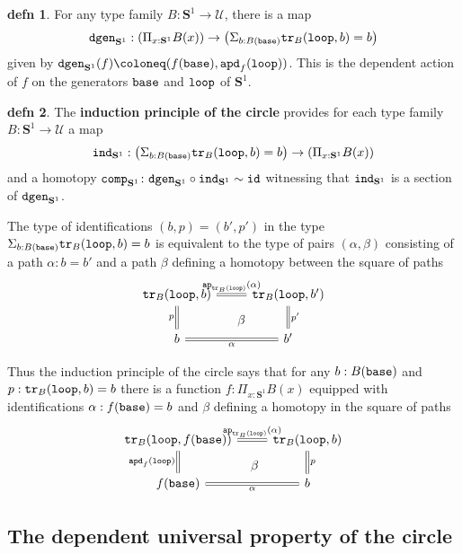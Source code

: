 \documentclass{amsart}
\theoremstyle{theorem}
\theoremstyle{definition}
\newtheorem*{defn}{defn}
\theoremstyle{remark}
\newcommand{\0}{\mathbbe{0}}
\newcommand{\1}{\mathbbe{1}}
\newcommand{\2}{\mathbbe{2}}
\newcommand{\3}{\mathbbe{3}}
\newcommand{\4}{\mathbbe{4}}
\newcommand{\term}[1]{{\textup{\texttt{#1}}}}
\newcommand{\id}{\term{id}}
\newcommand{\ind}{\term{ind}}
\newcommand{\ap}{\term{ap}}
\newcommand{\tr}{\term{tr}}
\newcommand{\apd}{\term{apd}}
\newcommand{\UU}{{\mathcal{U}}}
\newcommand{\Sone}{\mathbf{S}^1}
\newcommand{\base}{\term{base}}
\newcommand{\lloop}{\term{loop}}
\begin{document}
\begin{defn} For any type family $B : \Sone \to \UU$, there is a map
  \[ \term{dgen}_{\Sone} : \left( \Pi_{x: \Sone} B(x) \right) \to \left(\Sigma_{b : B(\base)} \tr_B(\lloop, b) = b\right)\]
  given by $\term{dgen}_{\Sone}(f) \coloneq (f(\base), \apd_f(\lloop))$. This is the dependent action of $f$ on the generators $\base$ and $\lloop$ of $\Sone$.
\end{defn}

\begin{defn} The \textbf{induction principle of the circle} provides for each type family $B : \Sone \to \UU$ a map
  \[ \ind_{\Sone} : \left( \Sigma_{b : B(\base)} \tr_B(\lloop, b) = b \right) \to \left(\Pi_{x:\Sone} B(x)\right)\]
and a homotopy $\term{comp}_{\Sone} \colon \term{dgen}_{\Sone}\circ \ind_{\Sone} \sim \id$  witnessing that $\ind_{\Sone}$ is a section of $\term{dgen}_{\Sone}$.
\end{defn}

The type of identifications $(b,p) = (b',p')$ in the type $\Sigma_{b : B(\base)} \tr_B(\lloop, b) = b$ is equivalent to the type of pairs $(\alpha, \beta)$ consisting of a path $\alpha \colon b = b'$ and a path $\beta$ defining a homotopy between the square of paths
\[
  \begin{tikzcd}
\tr_B(\lloop, b) \arrow[d, equals, "p"'] \arrow[dr, phantom, "\beta"]\arrow[r, equals, "\ap_{\tr_B(\lloop)}(\alpha)"] & \tr_B(\lloop,b') \arrow[d, equals, "p'"] \\ b \arrow[r, equals, "\alpha"'] & b'
  \end{tikzcd}
\]

Thus the induction principle of the circle says that for any $b : B(\base)$ and $p : \tr_B(\lloop,b) = b$ there is a function $f : \Pi_{x:\Sone} B(x)$ equipped with identifications $\alpha : f(\base) =b$ and $\beta$ defining a homotopy in the square of paths
\[
  \begin{tikzcd}
\tr_B(\lloop, f(\base)) \arrow[d, equals, "\apd_f(\lloop)"'] \arrow[dr, phantom, "\beta"]\arrow[r, equals, "\ap_{\tr_B(\lloop)}(\alpha)"] & \tr_B(\lloop,b) \arrow[d, equals, "p"] \\ f(\base) \arrow[r, equals, "\alpha"'] & b
  \end{tikzcd}
\]

\subsection*{The dependent universal property of the circle}
\end{document}
